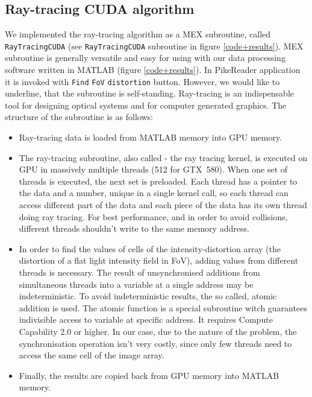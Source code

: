 \documentclass[12pt,dvips]{elsarticle}
\begin{document}
\subsection{Ray-tracing CUDA algorithm}
We implemented the ray-tracing algorithm as a MEX subroutine, called \verb"RayTracingCUDA" (see \verb"RayTracingCUDA"
subroutine in figure \ref{code+results}). MEX subroutine is generally versatile and easy for using with our data
processing software written in MATLAB (figure \ref{code+results}). In PikeReader application it is invoked with
\verb"Find" \verb"FoV" \verb"distortion" button. However, we would like to underline, that the subroutine is
self-standing. Ray-tracing is an indispensable tool for designing optical systems and for computer generated graphics. The
structure of the subroutine is as follows:
\begin{itemize}
\item Ray-tracing data is loaded from MATLAB memory into GPU memory.

\item The ray-tracing subroutine, also called - the ray tracing kernel, is executed on GPU in massively multiple threads
(512 for GTX~580). When one set of threads is executed, the next set is preloaded. Each thread has a pointer to the data
and a number, unique in a single kernel call, so each thread can access different part of the data and each piece of the
data has its own thread doing ray tracing. For best performance, and in order to avoid collisions, different threads
shouldn't write to the same memory address.

\item In order to find the values of cells of the intensity-distortion array (the distortion of a flat light intensity
field in FoV), adding values from different threads is necessary. The result of unsynchronised additions from simultaneous
threads into a variable at a single address may be indeterministic. To avoid indeterministic results, the so called,
atomic addition is used. The atomic function is a special subroutine witch guarantees indivisible access to variable at
specific address. It requires Compute Capability 2.0 or higher. In our case, due to the nature of the problem, the
synchronisation operation isn't very costly, since only few threads need to access the same cell of the image array.

\item Finally, the results are copied back from GPU memory into MATLAB memory.
\end{itemize}
\end{document}
